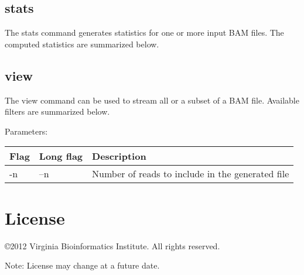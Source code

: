 \documentclass[11pt]{article}
\begin{document}
\subsection{stats}
The stats command generates statistics for one or more input BAM files. The computed statistics are summarized below.

\subsection{view}
The view command can be used to stream all or a subset of a BAM file. Available filters are summarized below.

Parameters:
\begin{center}
\begin{tabular}{llp{3.5in}}
\hline
Flag&Long flag&Description\\ \hline
-n&--n&Number of reads to include in the generated file\\
\end{tabular}
\end{center}



\section {License}
\copyright 2012 Virginia Bioinformatics Institute. All rights reserved.

Note: License may change at a future date.
\end{document}
